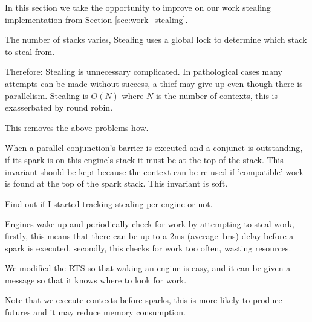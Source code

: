 


In this section we take the opportunity to improve on our work stealing
implementation from Section \ref{sec:work_stealing}.

The number of stacks varies,
Stealing uses a global lock to determine which stack to steal from.

Therefore:
Stealing is unnecessary complicated.
In pathological cases many attempts can be made without success,
a thief may give up even though there is parallelism.
Stealing is $O(N)$ where $N$ is the number of contexts, this is exasserbated
by round robin.

This removes the above problems how.

When a parallel conjunction's barrier is executed and a conjunct is
outstanding, if its spark is on this engine's stack it must be at the top of
the stack.
This invariant should be kept because the context can be re-used if
'compatible' work is found at the top of the spark stack.
This invariant is soft.

Find out if I started tracking stealing per engine or not.

Engines wake up and periodically check for work by attempting to
steal work,
firstly, this means that there can be up to a 2ms (average 1ms) delay before
a spark is executed.
secondly, this checks for work too often, wasting resources.

We modified the RTS so that waking an engine is easy, and it can be given a
message so that it knows where to look for work.


Note that we execute contexts before sparks,
this is more-likely to produce futures and it may reduce memory consumption.

